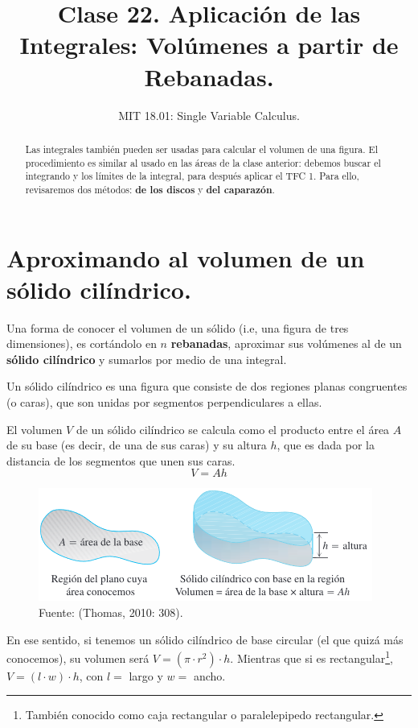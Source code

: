 \documentclass[12pt]{article}
\title{Clase 22. Aplicación de las Integrales: Volúmenes a partir de Rebanadas.}
\author{MIT 18.01: Single Variable Calculus.}
\date{}
\begin{document}
\maketitle

\begin{abstract}
\noindent Las integrales también pueden ser usadas para calcular el volumen de una figura. El procedimiento es similar al usado en las áreas de la clase anterior: debemos buscar el integrando y los límites de la integral, para después aplicar el TFC 1. Para ello, revisaremos dos métodos: \textbf{de los discos} y \textbf{del caparazón}.
\end{abstract}


\section{Aproximando al volumen de un sólido cilíndrico.}

Una forma de conocer el volumen de un sólido (i.e, una figura de tres dimensiones), es cortándolo en $n$ \textbf{rebanadas}, aproximar sus volúmenes al de un \textbf{sólido cilíndrico} y sumarlos por medio de una integral.

Un sólido cilíndrico es una figura que consiste de dos regiones planas congruentes (o caras), que son unidas por segmentos perpendiculares a ellas.


El volumen $V$ de un sólido cilíndrico se calcula como el producto entre el área $A$ de su base (es decir, de una de sus caras) y su altura $h$, que es dada por la distancia de los segmentos que unen sus caras. 
\[
  V = Ah
\]

\begin{figure}[hbt!]
\centering
\includegraphics[scale=0.6]{img/solid-cylindric.jpg}
\caption{Fuente: (Thomas, 2010: 308).}
\end{figure}

\newpage

En ese sentido, si tenemos un sólido cilíndrico de base circular (el que quizá más conocemos), su volumen será $V = (\pi \cdot  r^{2}) \cdot h$. Mientras que si es rectangular\footnote{También conocido como caja rectangular o paralelepipedo rectangular.}, $V = (l \cdot w) \cdot h$, con $l =$ largo y $w =$ ancho.
\end{document}
